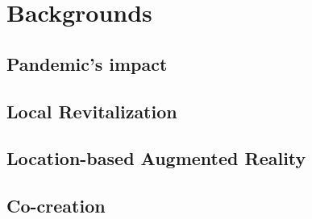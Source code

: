 \chapter{Backgrounds} \label{ch:2}

\section{Pandemic's impact}

\section{Local Revitalization}

\section{Location-based Augmented Reality}

\section{Co-creation}